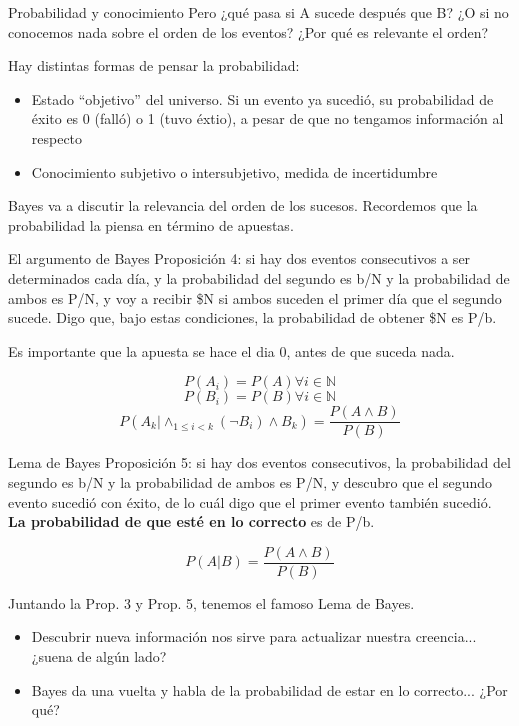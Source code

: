 \documentclass{beamer}
\begin{document}
\begin{frame}{Probabilidad y conocimiento}
	Pero ¿qué pasa si A sucede después que B? ¿O si no conocemos nada sobre el orden de los eventos? ¿Por qué es relevante el orden?\pause

	Hay distintas formas de pensar la probabilidad:
	\begin{itemize}
		\item Estado ``objetivo'' del universo. Si un evento ya sucedió, su probabilidad de éxito es 0 (falló) o 1 (tuvo éxtio), a pesar de que no tengamos información al respecto
		\item Conocimiento subjetivo o intersubjetivo, medida de incertidumbre
	\end{itemize}
	\pause

	Bayes va a discutir la relevancia del orden de los sucesos.
	Recordemos que la probabilidad la piensa en término de apuestas.
\end{frame}

\begin{frame}{El argumento de Bayes}
	Proposición 4: si hay dos eventos consecutivos a ser determinados cada día, y la probabilidad del segundo es b/N y la probabilidad de ambos es P/N, y voy a recibir \$N si ambos suceden el primer día que el segundo sucede. Digo que, bajo estas condiciones, la probabilidad de obtener \$N es P/b.

    Es importante que la apuesta se hace el dia 0, antes de que suceda nada.\pause

    $$P(A_i) = P(A) \forall i \in \mathbb{N}$$
    $$P(B_i) = P(B) \forall i \in \mathbb{N}$$
	$$P(A_k | \land_{1 \leq i < k} (\neg B_i) \land  B_k) = \frac{P(A \land B)}{P(B)}$$
\end{frame}

\begin{frame}{Lema de Bayes}
	Proposición 5: si hay dos eventos consecutivos, la probabilidad del segundo es b/N y la probabilidad de ambos es P/N, y descubro que el segundo evento sucedió con éxito, de lo cuál digo que el primer evento también sucedió. \textbf{La probabilidad de que esté en lo correcto} es de P/b.\pause

	$$P(A | B) = \frac{P(A \land B)}{P(B)}$$

	Juntando la Prop. 3 y Prop. 5, tenemos el famoso Lema de Bayes.
	\pause

	\begin{itemize}
		\item Descubrir nueva información nos sirve para actualizar nuestra creencia... ¿suena de algún lado?\pause
		\item Bayes da una vuelta y habla de la probabilidad de estar en lo correcto... ¿Por qué?
	\end{itemize}
\end{frame}
\end{document}
